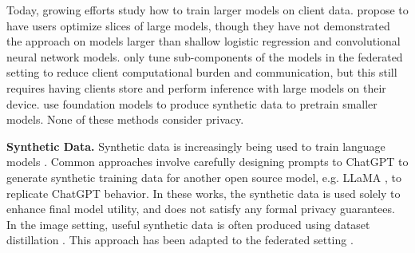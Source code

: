 Today, growing efforts study how to train larger models on client data.  \citet{charles2022federated} propose to have users optimize slices of large models, though they have not demonstrated the approach on models larger than shallow logistic regression and convolutional neural network models.  \citet{collins2023profit, cai2022fedadapter, zhang2023towards, zhao2022reduce, guo2023promptfl} only tune sub-components of the models in the federated setting to reduce client computational burden and communication, but this still requires having clients store and perform inference with large models on their device.  \citet{zhang2023gpt} use foundation models to produce synthetic data to pretrain smaller models.  None of these methods consider privacy.




\textbf{Synthetic Data.} Synthetic data is increasingly being used to train language models \citep{alpaca, wang2022self, honovich2022unnatural}.  Common approaches involve carefully designing prompts to ChatGPT \citep{radford2019language} to generate synthetic training data for another open source model, e.g. LLaMA \citep{touvron2023llama}, to replicate ChatGPT behavior.
In these works, the synthetic data is used solely to enhance final model utility, and does not satisfy any formal privacy guarantees. In the image setting, useful synthetic data is often produced using dataset distillation \citep{wang2018dataset, zhao2020dataset, cazenavette2022dataset}. This approach has been adapted to the federated setting \citep{song2023federated}.



